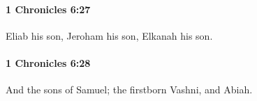 		\paragraph{1 Chronicles 6:27} %
			\label{1CHRONICLES-6-27}

			Eliab his son, Jeroham his son, Elkanah his son.


		\paragraph{1 Chronicles 6:28} %
			\label{1CHRONICLES-6-28}

			And the sons of Samuel; the firstborn Vashni, and Abiah.


